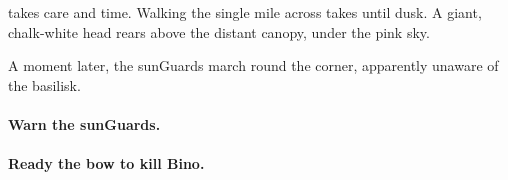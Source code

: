 takes care and time.
Walking the single mile across takes until dusk.
A giant, chalk-white head rears above the distant canopy, under the pink sky.

A moment later, the \glspl{sunGuard} march round the corner, apparently unaware of the \gls{basilisk}.

\paragraph{Warn the \glspl{sunGuard}.}

\paragraph{Ready the \gls{bow} to kill Bino.}
